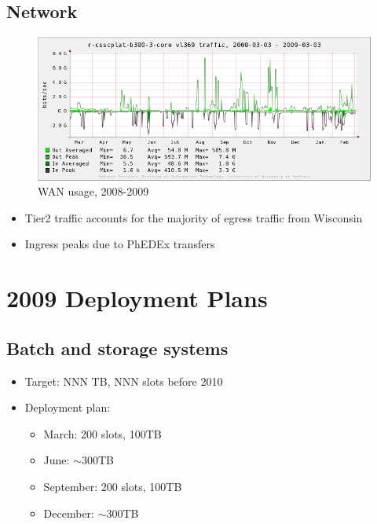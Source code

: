 \documentclass{beamer}
\newcommand{\ca}{\ensuremath{\sim}}
\begin{document}
\subsection{Network}
\begin{frame}
\begin{figure}
    \includegraphics[width=\textwidth]{Graphics/network-1yr.png}
    \caption{WAN usage, 2008-2009}

\end{figure}
\begin{itemize}
    \item Tier2 traffic accounts for the majority of egress traffic from Wisconsin
    \item Ingress peaks due to PhEDEx transfers
\end{itemize}
\end{frame}

\section{2009 Deployment Plans}
\subsection{Batch and storage systems}
\begin{frame}
\begin{itemize}
    \item Target: NNN TB, NNN slots before 2010
    \item Deployment plan:
    \begin{itemize}
        \item March: 200 slots, 100TB
        \item June: \ca{}300TB
        \item September: 200 slots, 100TB
        \item December: \ca{}300TB
    \end{itemize}
\end{itemize}
\end{frame}
\end{document}
